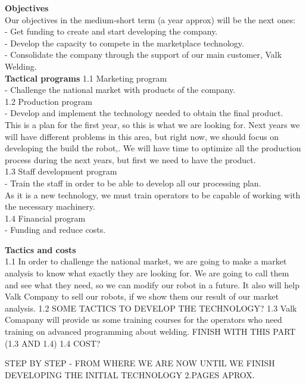 \textbf{Objectives}\\
Our objectives in the medium-short term (a year approx) will be the next ones:\\
	- Get funding to create and start developing the company.\\
	- Develop the capacity to compete in the marketplace technology.\\
	- Consolidate the company through the support of our main customer, Valk Welding.\\
\textbf{Tactical programs}
1.1 Marketing program\\
	- Challenge the national market with products of the company.\\
1.2 Production program\\
	- Develop and implement the technology needed to obtain the final product.\\
	This is a plan for the first year, so this is what we are looking for. Next years we will have different problems in this 	   area, but right now, we should focus on developing the build the robot,. We will have time to optimize all the production process during the next years, but first we need to have the product.\\
1.3 Staff development program\\
	- Train the staff in order to be able to develop all our processing plan.\\
	As it is a new technology, we must train operators to be capable of working with the necessary machinery.\\
1.4 Financial program\\
	- Funding and reduce costs.

\textbf{Tactics and costs}\\
1.1 In order to challenge the national market, we are going to make a market analysis to know what exactly they are looking for. We are going to call them and see what they need, so we can modify our robot in a future. It also will help Valk Company to sell our robots, if we show them our result of our market analysis.
1.2 SOME TACTICS TO DEVELOP THE TECHNOLOGY?
1.3 Valk Comapany will provide us some training courses for the operators who need training on advanced programming about welding. FINISH WITH THIS PART (1.3 AND 1.4)
1.4 
COST?	


STEP BY STEP - FROM WHERE WE ARE NOW UNTIL WE FINISH DEVELOPING THE INITIAL TECHNOLOGY 2.PAGES APROX.
